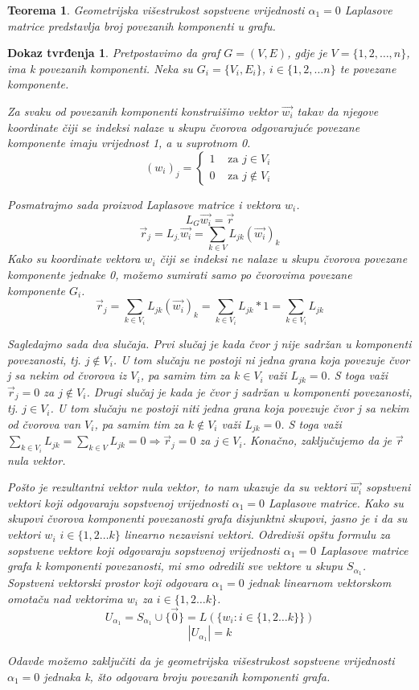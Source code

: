 \documentclass[11pt]{article}
\newtheorem{theorem}{Teorema}
\newtheorem*{custom_proof}{Dokaz tvrđenja}
\begin{document}
	\begin{theorem} 
	Geometrijska višestrukost sopstvene vrijednosti $\alpha_1 = 0$ Laplasove matrice predstavlja broj povezanih komponenti u grafu.
	\end{theorem}
	
	\begin{custom_proof}
	Pretpostavimo da graf $G = (V, E)$, gdje je $V = \{1, 2, \dots, n\}$, ima k povezanih komponenti. Neka su $G_i = \{V_i,E_i\}$, $i \in \{1,2, \dots n\}$ te povezane komponente.

	Za svaku od povezanih komponenti konstruišimo vektor $\vec{w_i}$ takav da njegove koordinate čiji se indeksi nalaze u skupu čvorova odgovarajuće povezane komponente imaju vrijednost 1, a u suprotnom 0.
	\[
	 (w_{i})_j =
	 \begin{cases}
	 1  & \text{ za } j \in V_i \\ 
	 0  & \text{ za } j \notin V_i
	 \end{cases}
	\]
	
	Posmatrajmo sada proizvod Laplasove matrice i vektora $w_i$.
	\[
	L_G\vec{w_i} = \vec{r}
	\]
	\[
	\vec{r}_j = L_{j.} \vec{w_i} = \sum_{ k  \in V} L_{jk}(\vec{w_{i}})_k 
	\]
	Kako su koordinate vektora $w_i$ čiji se indeksi ne nalaze u skupu čvorova povezane komponente jednake 0, možemo sumirati samo po čvorovima povezane komponente $G_i$. 
	\[
	\vec{r}_j = \sum_{ k  \in V_i} L_{jk}(\vec{w_{i}})_k = \sum_{ k  \in V_i} L_{jk} * 1 = \sum_{ k  \in V_i} L_{jk}
	\]

	Sagledajmo sada dva slučaja. Prvi slučaj je kada čvor j nije sadržan u komponenti povezanosti, tj. $j \notin V_i$.
	U tom slučaju ne postoji ni jedna grana koja povezuje čvor j sa nekim od čvorova iz $V_i$, pa samim tim za $k \in V_i$ važi $L_{jk} = 0$.
	S toga važi $\vec{r}_j = 0$ za $j \notin V_i$.
	Drugi slučaj je kada je čvor j sadržan u komponenti povezanosti, tj. $j \in V_i$.
	U tom slučaju ne postoji niti jedna grana koja povezuje čvor j sa nekim od čvorova van $V_i$, pa samim tim za $k \notin V_i$ važi $L_{jk} = 0$.
	S toga važi $ \sum_{k \in V_i}L_{jk} = \sum_{k \in V}L_{jk} = 0 \Rightarrow \vec{r}_j = 0$ za $j \in V_i$. Konačno, zaključujemo da je $\vec{r}$ nula vektor.
	
	Pošto je rezultantni vektor nula vektor, to nam ukazuje da su vektori $\vec{w_i}$ sopstveni vektori koji odgovaraju sopstvenoj vrijednosti $\alpha_1 = 0$ Laplasove matrice.
	Kako su skupovi čvorova komponenti povezanosti grafa disjunktni skupovi, jasno je i da su vektori $w_i$ $i \in \{1,2 \dots k\}$ linearno nezavisni vektori.
	Odredivši opštu formulu za sopstvene vektore koji odgovaraju sopstvenoj vrijednosti $\alpha_1 = 0$ Laplasove matrice grafa k komponenti povezanosti, mi smo odredili sve vektore u skupu $S_{\alpha_1}$.
	Sopstveni vektorski prostor koji odgovara $\alpha_1 = 0$ jednak linearnom vektorskom omotaču nad vektorima $w_i$ za $i \in \{1,2 \dots k\}$.
	\[
	U_{\alpha_1} = S_{\alpha_1} \cup \{\vec{0}\}= L (\{ w_i : i \in \{1,2 \dots k\}\})
	\]
	\[
	|U_{\alpha_1}| = k
	\]
	
	Odavde možemo zaključiti da je geometrijska višestrukost sopstvene vrijednosti $\alpha_1 = 0$ jednaka k, što odgovara broju povezanih komponenti grafa.
	\end{custom_proof}
	
\end{document}
